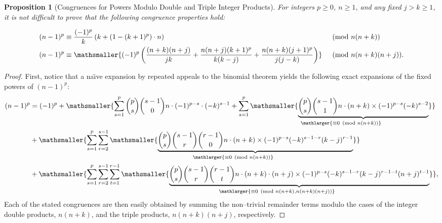 \documentclass[12pt,reqno]{article}
\renewenvironment{subequations}{%
  \refstepcounter{equation}%
  \edef\theparentequation{\theequation}%
  \setcounter{parentequation}{\value{equation}}%
  \setcounter{equation}{0}%
  \def\theequation{\theparentequation.\alph{equation}}%
  \ignorespaces
}{%
  \setcounter{equation}{\value{parentequation}}%
  \ignorespacesafterend
}
\numberwithin{sfootnote}{section}
\numberwithin{equation}{section}
\theoremstyle{DefaultTheoremStyle}
\newtheorem{prop}[theorem]{Proposition}
\theoremstyle{definition}
\newcommand{\undersetbrace}[2]{\ensuremath{\underset{\mathlarger{#1}}{\mathsmaller{\underbrace{#2}}}}}
\newcommand{\StartGroupingSubEquations}{\begin{subequations}}
\newcommand{\EndGroupingSubEquations}{\end{subequations}}
\begin{document}
\begin{prop}[Congruences for Powers Modulo Double and Triple Integer Products] 
For integers $p \geq 0$, $n \geq 1$, and any fixed $j > k \geq 1$, 
it is not difficult to prove that the 
following congruence properties hold: 
\StartGroupingSubEquations 
\label{eqn_CongruencesForPowsOfN_ModDblTripleIntProducts} 
\begin{align} 
(n-1)^{p} 
     & \equiv 
     \frac{(-1)^{p}}{k}\left(k + (1- (k+1)^{p}) \cdot n\right) 
     && \pmod{n(n+k)} \\ 
(n-1)^{p}     
     & \equiv 
     \mathsmaller{ 
     (-1)^{p} \left( 
     \frac{(n+k)(n+j)}{jk} + 
     \frac{n(n+j) (k+1)^{p}}{k(k-j)} + 
     \frac{n(n+k) (j+1)^{p}}{j(j-k)} 
     \right) 
     } 
     && \pmod{n(n+k)(n+j)}. 
\end{align} 
\EndGroupingSubEquations 
\end{prop} 
\begin{proof} 
First, notice that a na\"{\i}ve expansion by repeated appeals to the 
binomial theorem yields the following exact expansions of the 
fixed powers of $(n-1)^{p}$: 
{\smaller 
     \begin{align*} 
     (n-1)^{p} & = 
          (-1)^{p} + 
          \mathsmaller{ 
          \sum\limits_{s=1}^{p} \binom{p}{s} \binom{s-1}{0} 
          n \cdot (-1)^{p-s} \cdot (-k)^{s-1} + %
          \sum\limits_{s=1}^{p} 
          \undersetbrace{\equiv 0 \pmod{n(n+k)}}{ 
          \binom{p}{s} \binom{s-1}{1} 
          n \cdot (n+k) \times (-1)^{p-s} (-k)^{s-2} 
          } 
          } \\ 
          & + 
          \mathsmaller{ 
          \sum\limits_{s=1}^{p} \sum\limits_{r=2}^{s-1} 
          \undersetbrace{\equiv 0 \pmod{n(n+k)}}{ 
          \binom{p}{s} \binom{s-1}{r} \binom{r-1}{0} 
          n \cdot (n+k) \times 
          (-1)^{p-s} (-k)^{s-1-r} (k-j)^{r-1} 
          } 
          } \\ 
          & + 
          \mathsmaller{ 
          \sum\limits_{s=1}^{p} \sum\limits_{r=2}^{s-1} \sum\limits_{t=1}^{r-1} 
          \undersetbrace{\equiv 0 \pmod{n(n+k),n(n+k)(n+j)}}{ 
          \binom{p}{s} \binom{s-1}{r} \binom{r-1}{t} 
          n \cdot (n+k) \cdot (n+j) \times 
          (-1)^{p-s} (-k)^{s-1-r} (k-j)^{r-1-t} (n+j)^{t-1} 
          } 
          }, 
     \end{align*}}
Each of the stated congruences are then easily obtained by summing the 
non--trivial remainder terms modulo the cases of the 
integer double products, $n(n+k)$, and the 
triple products, $n(n+k)(n+j)$, respectively. 
\end{proof} 
\end{document}
